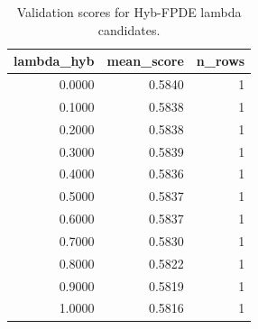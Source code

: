 \begin{table}[t]
\caption{Validation scores for Hyb-FPDE lambda candidates.}
\label{tab:lambda_distribution_computed}
\centering
\begin{tabular}{rrr}
\toprule
lambda\_hyb & mean\_score & n\_rows \\
\midrule
0.0000 & 0.5840 & 1 \\
0.1000 & 0.5838 & 1 \\
0.2000 & 0.5838 & 1 \\
0.3000 & 0.5839 & 1 \\
0.4000 & 0.5836 & 1 \\
0.5000 & 0.5837 & 1 \\
0.6000 & 0.5837 & 1 \\
0.7000 & 0.5830 & 1 \\
0.8000 & 0.5822 & 1 \\
0.9000 & 0.5819 & 1 \\
1.0000 & 0.5816 & 1 \\
\bottomrule
\end{tabular}

\end{table}
